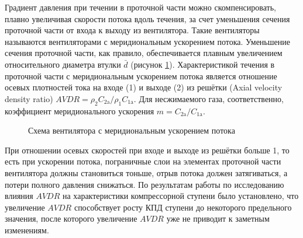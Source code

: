 Градиент давления при течении в проточной части можно скомпенсировать, плавно увеличивая скорости потока вдоль течения, за счет уменьшения сечения проточной части от входа к выходу из вентилятора. Такие вентиляторы называются вентиляторами с меридиональным ускорением потока. Уменьшение сечения проточной части, как правило, обеспечивается плавным увеличением относительного диаметра втулки \(\bar{d}\) (рисунок \ref{fig:schemaMrdnl}). Характеристикой течения в проточной части с меридиональным ускорением потока является отношение осевых плотностей тока на входе (1) и выходе (2) из решётки (Axial velocity density ratio) \(AVDR = \rho_2 C_\text{2a}/\rho_1 C_\text{1a}\). Для несжимаемого газа, соответственно, коэффициент меридионального ускорения \(m = C_\text{2a}/C_\text{1a}\). 
\begin{figure}[ht]
	\caption{Схема вентилятора с меридиональным ускорением потока \cite{Brusilovskiy2004}}
	\label{fig:schemaMrdnl}
\end{figure}

При отношении осевых скоростей при входе и выходе из решётки больше 1, то есть при ускорении потока, пограничные слои на элементах проточной части вентилятора должны становиться тоньше, отрыв потока должен затягиваться, а потери полного давления снижаться. По результатам работы \cite{SenthilKumaran2015} по исследованию влияния \(AVDR\) на характеристики компрессорной ступени было установлено, что увеличение \(AVDR\) способствует росту КПД ступени до некоторого предельного значения, после которого увеличение \(AVDR\) уже не приводит к заметным изменениям. 
 
